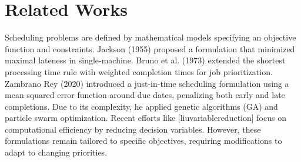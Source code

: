 \documentclass[12pt]{article}
\begin{document}
\section*{Related Works}

Scheduling problems are defined by mathematical models specifying an objective function and constraints. Jackson (1955) proposed a formulation that minimized maximal lateness in single-machine. Bruno et al. (1973) extended the shortest processing time rule with weighted completion times for job prioritization. Zambrano Rey (2020) introduced a just-in-time scheduling formulation using a mean squared error function around due dates, penalizing both early and late completions. Due to its complexity, he applied genetic algorithms (GA) and particle swarm optimization. Recent efforts like [liuvariablereduction] focus on computational efficiency by reducing decision variables. However, these formulations remain tailored to specific objectives, requiring modifications to adapt to changing priorities.



\end{document}
